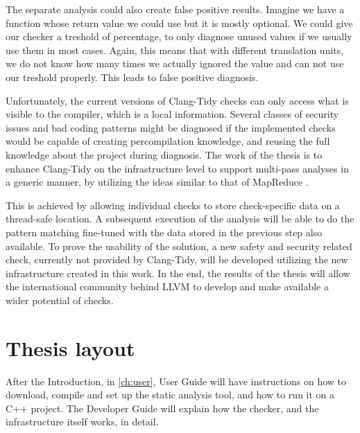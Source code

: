 The separate analysis could also create false positive results. Imagine we have a function whose return value we could use but it is mostly
optional. We could give our checker a treshold of percentage, to only diagnose unused values if we usually use them in most cases. Again, this
means that with different translation units, we do not know how many times we actually ignored the value and can not use our treshold properly.
This leads to false positive diagnosis.

Unfortunately, the current versions of Clang-Tidy checks can only access what is visible to the compiler, which is a local information.
Several classes of security issues and bad coding patterns might be diagnosed if the implemented checks would be capable of creating 
percompilation knowledge, and reusing the full knowledge about the project during diagnosis.
The work of the thesis is to enhance Clang-Tidy on the infrastructure level to support multi-pass analyses in a generic manner, by 
utilizing the ideas similar to that of MapReduce \cite{mapreduce}.

This is achieved by allowing individual checks to store check-specific data on a thread-safe location.
A subsequent execution of the analysis will be able to do the pattern matching fine-tuned with the data stored in the previous step also
available.
To prove the usability of the solution, a new safety and security related check, currently not provided by Clang-Tidy, will be developed
utilizing the new infrastructure created in this work.
In the end, the results of the thesis will allow the international community behind LLVM to develop and make available a wider potential of
checks.

\section{Thesis layout}

After the Introduction, in \cref{ch:user}, User Guide will have instructions on how to download, compile and set up the static analysis tool, and
how to run it on a C++ project. The Developer Guide will explain how the checker, and the infrastructure itself works, in detail.
